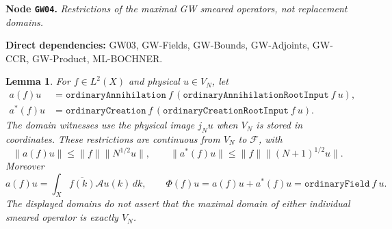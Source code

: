 \documentclass[11pt,a4paper]{article}
\newtheorem{lemma}[theorem]{Lemma}
\theoremstyle{remark}\newtheorem{remark}[theorem]{Remark}
\newcommand{\F}{\mathcal F}\newcommand{\Q}{\mathcal Q}\newcommand{\HH}{\mathcal H}
\newcommand{\node}[3]{\par\Needspace{6\baselineskip}\smallskip\hypertarget{node:#1}{}\label{nodepage:#1}\noindent\textbf{Node \texttt{#1}.} \textit{#2.}\par\noindent\textbf{Direct dependencies:} #3.\par}
\begin{document}
\node{GW04}{Restrictions of the maximal GW smeared operators, not replacement domains}{GW03, GW-Fields, GW-Bounds, GW-Adjoints, GW-CCR, GW-Product, ML-BOCHNER}
\begin{lemma}\label{lem:gwrestrictions}
For $f\in L^2(X)$ and physical $u\in V_N$, let
\begin{align*}
 a(f)u&=\texttt{ordinaryAnnihilation}\ f\,
       (\texttt{ordinaryAnnihilationRootInput}\ f\ u),\\
 a^*(f)u&=\texttt{ordinaryCreation}\ f\,
       (\texttt{ordinaryCreationRootInput}\ f\ u).
\end{align*}
The domain witnesses use the physical image $j_Nu$ when $V_N$ is stored in coordinates. These restrictions are continuous from $V_N$ to $\F$, with
\[
 \|a(f)u\|\leq\|f\|\|N^{1/2}u\|,\qquad
 \|a^*(f)u\|\leq\|f\|\|(N+1)^{1/2}u\|.
\]
Moreover
\[
 a(f)u=\int_X\overline{f(k)}\mathcal Au(k)\,dk,
 \qquad \Phi(f)u=a(f)u+a^*(f)u
       =\texttt{ordinaryField}\ f\ u.
\]
The displayed domains do not assert that the maximal domain of either individual smeared operator is exactly $V_N$.
\end{lemma}
\end{document}
